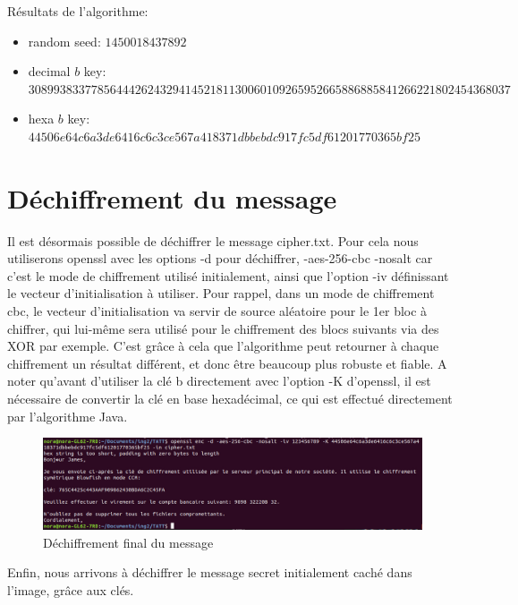 \documentclass[12pt, oneside]{article}
\begin{document}
Résultats de l'algorithme: 
\begin{itemize}
  \item random seed: \(1450018437892\)
  \item decimal \(b\) key: \(30899383377856444262432941452181130060109265952665886885841266221802454368037\)
  \item hexa \(b\) key: \(44506e64c6a3de6416c6c3ce567a418371dbbebdc917fc5df61201770365bf25\)
\end{itemize}

\section{Déchiffrement du message}
Il est désormais possible de déchiffrer le message cipher.txt. Pour cela nous utiliserons openssl avec les options -d pour déchiffrer, -aes-256-cbc -nosalt car c'est le mode de chiffrement utilisé initialement, ainsi que l'option -iv définissant le vecteur d'initialisation à utiliser. Pour rappel, dans un mode de chiffrement cbc, le vecteur d'initialisation va servir de source aléatoire pour le 1er bloc à chiffrer, qui lui-même sera utilisé pour le chiffrement des blocs suivants via des XOR par exemple. C'est grâce à cela que l'algorithme peut retourner à chaque chiffrement un résultat différent, et donc être beaucoup plus robuste et fiable. A noter qu'avant d'utiliser la clé b directement avec l'option -K d'openssl, il est nécessaire de convertir la clé en base hexadécimal, ce qui est effectué directement par l'algorithme Java. 
\begin{figure}[ht]
\centering
\includegraphics[scale=0.4]{answer}
\caption{Déchiffrement final du message}
\end{figure}
Enfin, nous arrivons à déchiffrer le message secret initialement caché dans l'image, grâce aux clés.
\end{document}
